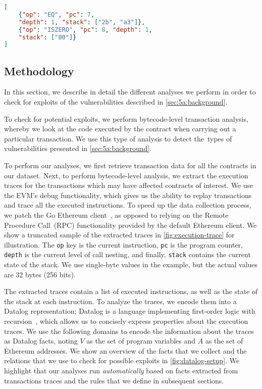 \begin{lstlisting}[basicstyle=\footnotesize\ttfamily,language=json,float=tb,floatplacement=tb,caption=Sample execution trace information.,label=fig:execution-trace]
[
    {"op": "EQ", "pc": 7, 
    "depth": 1, "stack": ["2b", "a3"]},
    {"op": "ISZERO", "pc": 8, "depth": 1,
    "stack": ["00"]}
]
\end{lstlisting}

\subsection{Methodology}
\label{sec:5a:methodology}

In this section, we describe in detail the different analyses we perform in order to check for exploits of the vulnerabilities described in \autoref{sec:5a:background}.

To check for potential exploits, we perform bytecode-level transaction analysis, whereby we look at the code executed by the contract when carrying out a particular transaction. We use this type of analysis to detect the~\VulnTypes types of vulnerabilities presented in \autoref{sec:5a:background}.

To perform our analyses, we first retrieve transaction data for all the contracts in our dataset. Next, to perform bytecode-level analysis, we extract the execution traces for the transactions which may have affected contracts of interest. We use the EVM's debug functionality, which gives us the ability to replay transactions and trace all the executed instructions. To speed up the data collection process, we patch the Go Ethereum client~\cite{go-ethereum}, as opposed to relying on the Remote Procedure Call~(RPC) functionality provided by the default Ethereum client.
We show a truncated sample of the extracted traces in \autoref{fig:execution-trace} for illustration. 
%
The \lstinline{op} key is the current instruction, \lstinline{pc} is the program counter, \lstinline{depth} is the current level of call nesting, and finally, \lstinline{stack} contains the current state of the stack. We use single-byte values in the example, but the actual values are 32 bytes (256 bits).

The extracted traces contain a list of executed instructions, as well as the state of the stack at each instruction.
To analyze the traces, we encode them into a Datalog representation; Datalog is a language implementing first-order logic with recursion~\cite{Immerman99descriptivecomplexity}, which allows us to concisely express properties about the execution traces.
We use the following domains to encode the information about the traces as Datalog facts, noting $V$ as the set of program variables and $A$ as the set of Ethereum addresses.
We show an overview of the facts that we collect and the relations that we use to check for possible exploits in \autoref{fig:datalog-setup}.
We highlight that our analyses run \emph{automatically} based on facts extracted from transactions traces and the rules that we define in subsequent sections. 

